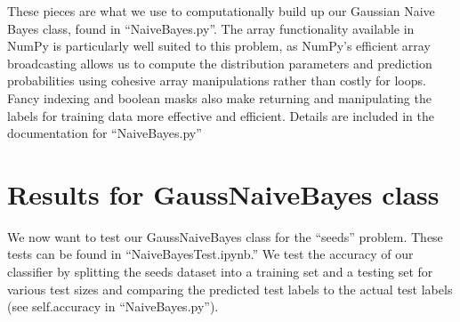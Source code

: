 \documentclass[12pt]{article}
\begin{document}
These pieces are what we use to computationally build up our Gaussian Naive Bayes class, found in ``NaiveBayes.py''. 
The array functionality available in NumPy is particularly well suited to this problem, as NumPy's efficient array broadcasting allows us to compute the distribution parameters and prediction probabilities using cohesive array manipulations rather than costly for loops. 
Fancy indexing  and boolean masks also make returning and manipulating the labels for training data more effective and efficient.
Details are included in the documentation for ``NaiveBayes.py''

\section*{Results for GaussNaiveBayes class}
We now want to test our GaussNaiveBayes class for the ``seeds'' problem. 
These tests can be found in ``NaiveBayesTest.ipynb.''
We test the accuracy of our classifier by splitting the seeds dataset into a training set and a testing set for various test sizes and comparing the predicted test labels to the actual test labels (see self.accuracy in ``NaiveBayes.py''). 
\end{document}
